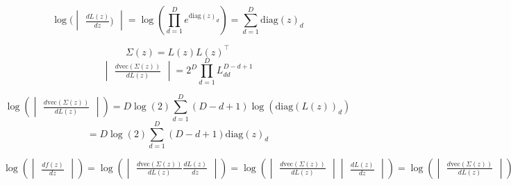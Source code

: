 \documentclass[11pt]{article}
\begin{document}
\[\log(\begin{vmatrix} \frac{d L(z)}{dz}) \end{vmatrix} = \log(\prod_{d=1}^D e^{\text{diag}(z)_d}) = \sum_{d=1}^D \text{diag}(z)_d \]

\[ \Sigma(z) = L(z) L(z)^\top \]
\[\begin{vmatrix} \frac{d \text{vec}(\Sigma(z))}{d L(z)} \end{vmatrix} = 2^D \prod_{d=1}^D L_{dd}^{D-d+1} \]

\[\log (\begin{vmatrix} \frac{d \text{vec}(\Sigma(z))}{d L(z)} \end{vmatrix}) = D \log(2) \sum_{d=1}^D (D-d+1) \log(\text{diag}(L(z))_d) \]
\[ =  D \log(2) \sum_{d=1}^D (D-d+1) \text{diag}(z)_d \]

\[\log(\begin{vmatrix} \frac{d f(z)}{dz} \end{vmatrix}) = \log(\begin{vmatrix} \frac{d \text{vec}(\Sigma(z))}{dL(z)} \frac{dL(z)}{dz} \end{vmatrix}) = \log(\begin{vmatrix} \frac{d \text{vec}(\Sigma(z))}{dL(z)} \end{vmatrix} \begin{vmatrix} \frac{dL(z)}{dz} \end{vmatrix}) =  \log(\begin{vmatrix} \frac{d \text{vec}(\Sigma(z))}{dL(z)} \end{vmatrix}) + \log( \begin{vmatrix} \frac{dL(z)}{dz} \end{vmatrix}) \]
\end{document}
